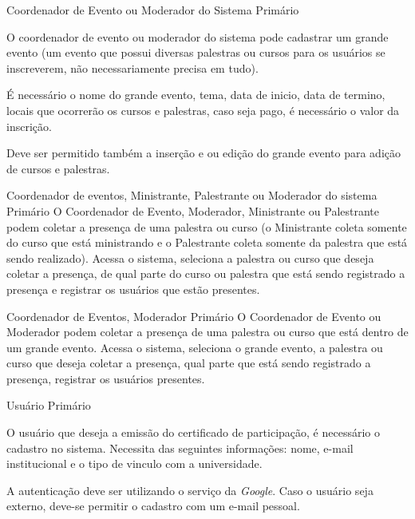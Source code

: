
{Coordenador de Evento ou Moderador do Sistema}
{Primário}
{O coordenador de evento ou moderador do sistema pode cadastrar um grande evento (um evento que possui diversas palestras ou cursos para os usuários se inscreverem, não necessariamente precisa em tudo).

É necessário o nome do grande evento, tema, data de inicio, data de termino, locais que ocorrerão os cursos e palestras, caso seja pago, é necessário o valor da inscrição.

Deve ser permitido também a inserção e ou edição do grande evento para adição de cursos e palestras.}

{Coordenador de eventos, Ministrante, Palestrante ou Moderador do sistema}
{Primário}
{O Coordenador de Evento, Moderador, Ministrante ou Palestrante podem coletar a presença de uma palestra ou curso (o Ministrante coleta somente do curso que está ministrando e o Palestrante coleta somente da palestra que está sendo realizado). Acessa o sistema, seleciona a palestra ou curso que deseja coletar a presença, de qual parte do curso ou palestra que está sendo registrado a presença e registrar os usuários que estão presentes.}

{Coordenador de Eventos, Moderador}
{Primário}
{O Coordenador de Evento ou Moderador podem coletar a presença de uma palestra ou curso que está dentro de um grande evento. Acessa o sistema, seleciona o grande evento, a palestra ou curso que deseja coletar a presença, qual parte que está sendo registrado a presença, registrar os usuários presentes.}

{Usuário}
{Primário}
{O usuário que deseja a emissão do certificado de participação, é necessário o cadastro no sistema. Necessita das seguintes informações: nome, e-mail institucional e o tipo de vinculo com a universidade.

A autenticação deve ser utilizando o serviço da \textit{Google}. Caso o usuário seja externo, deve-se permitir o cadastro com um e-mail pessoal.}

